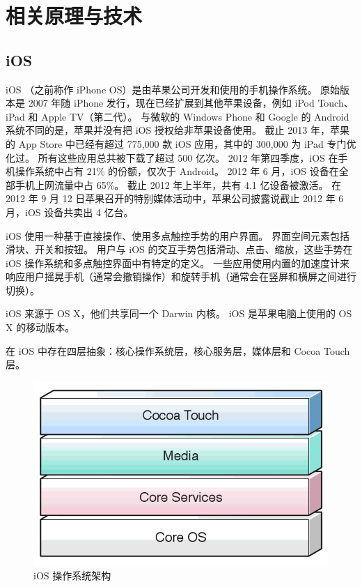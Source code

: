 \chapter{相关原理与技术}
\label{related-technologies}

\section{iOS}

iOS （之前称作 iPhone OS）是由苹果公司开发和使用的手机操作系统。
原始版本是 2007 年随 iPhone 发行，现在已经扩展到其他苹果设备，例如 iPod Touch、iPad 和 Apple TV（第二代）。
与微软的 Windows Phone 和 Google 的 Android 系统不同的是，苹果并没有把 iOS 授权给非苹果设备使用。
截止 2013 年，苹果的 App Store 中已经有超过 775,000 款 iOS 应用，其中的 300,000 为 iPad 专门优化过。
所有这些应用总共被下载了超过 500 亿次。
2012 年第四季度，iOS 在手机操作系统中占有 21\% 的份额，仅次于 Android。
2012 年 6 月，iOS 设备在全部手机上网流量中占 65\%。
截止 2012 年上半年，共有 4.1 亿设备被激活。
在 2012 年 9 月 12 日苹果召开的特别媒体活动中，苹果公司披露说截止 2012 年 6 月，iOS 设备共卖出 4 亿台。

iOS 使用一种基于直接操作、使用多点触控手势的用户界面。
界面空间元素包括滑块、开关和按钮。
用户与 iOS 的交互手势包括滑动、点击、缩放，这些手势在 iOS 操作系统和多点触控界面中有特定的定义。
一些应用使用内置的加速度计来响应用户摇晃手机（通常会撤销操作）和旋转手机（通常会在竖屏和横屏之间进行切换）。

iOS 来源于 OS X，他们共享同一个 Darwin 内核。
iOS 是苹果电脑上使用的 OS X 的移动版本。

在 iOS 中存在四层抽象：核心操作系统层，核心服务层，媒体层和 Cocoa Touch 层。

\begin{figure}[h!]
    \centering
    \includegraphics[width=400pt]{figure/iOS.png}
    \caption{iOS 操作系统架构}
    \label{ios}
\end{figure}

